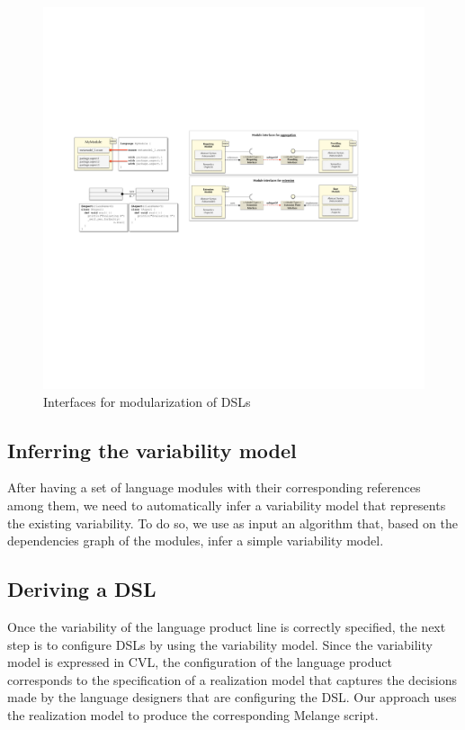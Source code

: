 \begin{figure}
\centering
\includegraphics[width=1\linewidth]{images/approaches-interfaces.pdf}
\caption{Interfaces for modularization of DSLs}
\label{fig:approaches-interfaces}
\end{figure}

\subsection{Inferring the variability model}

After having a set of language modules with their corresponding references among them, we need to automatically infer a variability model that represents the existing variability. To do so, we use as input an algorithm that, based on the dependencies graph of the modules, infer a simple variability model. 



\subsection{Deriving a DSL}

Once the variability of the language product line is correctly specified, the next step is to configure DSLs by using the variability model. Since the variability model is expressed in CVL, the configuration of the language product corresponds to the specification of a realization model that captures the decisions made by the language designers that are configuring the DSL. Our approach uses the realization model to produce the corresponding Melange script. 

